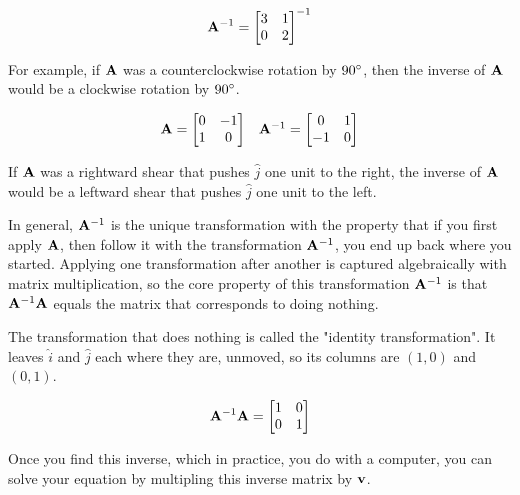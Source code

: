 \begin{equation*}
  \mathbf{A}^{-1} =
  \begin{bmatrix}
    3 & 1 \\
    0 & 2
  \end{bmatrix}^{-1}
\end{equation*}

For example, if $\mathbf{A}$ was a counterclockwise rotation by $90 \degree$, then
the inverse of $\mathbf{A}$ would be a clockwise rotation by $90 \degree$.

\begin{equation*}
  \begin{array}{cc}
  \mathbf{A} =
  \begin{bmatrix}
    0 & -1 \\
    1 & 0
  \end{bmatrix} &
  \mathbf{A}^{-1} =
  \begin{bmatrix}
    0 & 1 \\
    -1 & 0
  \end{bmatrix}
  \end{array}
\end{equation*}

If $\mathbf{A}$ was a rightward shear that pushes $\hat{j}$ one unit to the right,
the inverse of $\mathbf{A}$ would be a leftward shear that pushes $\hat{j}$ one
unit to the left.

In general, $\mathbf{A}^{-1}$ is the unique transformation with the property that
if you first apply $\mathbf{A}$, then follow it with the transformation
$\mathbf{A}^{-1}$, you end up back where you started. Applying one transformation
after another is captured algebraically with matrix multiplication, so the core
property of this transformation $\mathbf{A}^{-1}$ is that $\mathbf{A}^{-1}\mathbf{A}$
equals the matrix that corresponds to doing nothing.

The transformation that does nothing is called the "identity transformation". It
leaves $\hat{i}$ and $\hat{j}$ each where they are, unmoved, so its columns are
$(1, 0)$ and $(0, 1)$.

\begin{equation*}
  \mathbf{A}^{-1}\mathbf{A} =
  \begin{bmatrix}
    1 & 0 \\
    0 & 1
  \end{bmatrix}
\end{equation*}

Once you find this inverse, which in practice, you do with a computer, you can
solve your equation by multipling this inverse matrix by $\mathbf{v}$.


